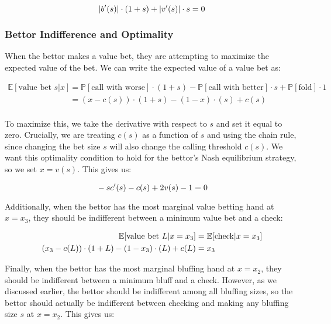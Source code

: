 \documentclass[../../main/main.tex]{subfiles}
\begin{document}
\begin{equation}{\label{callindiff}}
    |b'(s)| \cdot (1 + s) + |v'(s)| \cdot s = 0
\end{equation}

\subsubsection{Bettor Indifference and Optimality}

When the bettor makes a value bet, they are attempting to maximize the expected value of the bet. We can write the expected value of a value bet as:

\begin{align*}
    \mathbb{E}[\text{value bet } s | x] & = \mathbb{P}[\text{call with worse}] \cdot (1+s) - \mathbb{P}[\text{call with better}] \cdot s + \mathbb{P}[\text{fold}] \cdot 1 \\
    & = (x-c(s)) \cdot (1+s) - (1-x) \cdot (s) + c(s)\\
\end{align*}

To maximize this, we take the derivative with respect to $s$ and set it equal to zero. Crucially, we are treating $c(s)$ as a function of $s$ and using the chain rule, since changing the bet size $s$ will also change the calling threshold $c(s)$. We want this optimality condition to hold for the bettor's Nash equilibrium strategy, so we set $x=v(s)$. This gives us:

\begin{equation}{\label{valueoptimality}}
    -sc'(s) - c(s) + 2 v(s) - 1 = 0
\end{equation}

Additionally, when the bettor has the most marginal value betting hand at $x=x_3$, they should be indifferent between a minimum value bet and a check: 

\begin{align}{\label{valueindiff}}
    \nonumber \mathbb{E}[\text{value bet } L | x=x_3] & = \mathbb{E}[\text{check} | x=x_3]\\ 
    (x_3-c(L)) \cdot (1+L) - (1-x_3) \cdot (L) + c(L) & = x_3
\end{align}

Finally, when the bettor has the most marginal bluffing hand at $x=x_2$, they should be indifferent between a minimum bluff and a check. However, as we discussed earlier, the bettor should be indifferent among all bluffing sizes, so the bettor should actually be indifferent between checking and making any bluffing size $s$ at $x=x_2$. This gives us:
\end{document}

